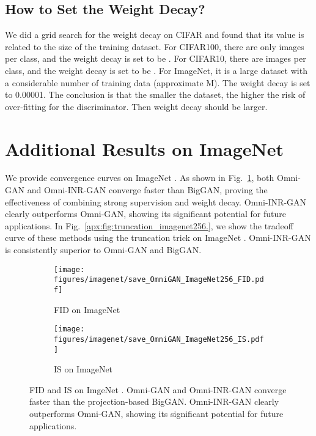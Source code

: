 \documentclass[paper_2425.tex]{subfiles}
\begin{document}
\subsection{How to Set the Weight Decay?}

We did a grid search for the weight decay on CIFAR and found that its value is related to the size of the training dataset. For CIFAR100, there are only  images per class, and the weight decay is set to be . For CIFAR10, there are  images per class, and the weight decay is set to be . For ImageNet, it is a large dataset with a considerable number of training data (approximate M). The weight decay is set to 0.00001. The conclusion is that the smaller the dataset, the higher the risk of over-fitting for the discriminator. Then weight decay should be larger.


\section{Additional Results on ImageNet}
\label{apx:sec:curves_imagenet}

We provide convergence curves on ImageNet . As shown in Fig.~\ref{apx:fig:imagenet256}, both Omni-GAN and Omni-INR-GAN converge faster than BigGAN, proving the effectiveness of combining strong supervision and weight decay. Omni-INR-GAN clearly outperforms Omni-GAN, showing its significant potential for future applications. In Fig.~\ref{apx:fig:truncation_imagenet256.}, we show the tradeoff curve of these methods using the truncation trick on ImageNet . Omni-INR-GAN is consistently superior to Omni-GAN and BigGAN.

\begin{figure}[t]
\centering
\begin{subfigure}{0.49\linewidth}
    \centering
    \texttt{[image: figures/imagenet/save\_OmniGAN\_ImageNet256\_FID.pdf]}
    \caption{FID on ImageNet }
  \end{subfigure}
  \begin{subfigure}{0.49\linewidth}
    \centering
    \texttt{[image: figures/imagenet/save\_OmniGAN\_ImageNet256\_IS.pdf]}
    \caption{IS on ImageNet }
  \end{subfigure}
  \vspace{-0.2cm}
  \caption{FID and IS on ImgeNet . Omni-GAN and Omni-INR-GAN converge faster than the projection-based BigGAN. Omni-INR-GAN clearly outperforms Omni-GAN, showing its significant potential for future applications.}
  \label{apx:fig:imagenet256}
\end{figure}
\end{document}
